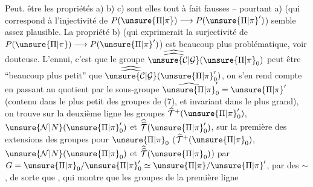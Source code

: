 
Peut. être les propriétés a) b) c) sont elles
tout à fait fausses -- pourtant a) (qui correspond à l'injectivité de
$P(\unsure{\Pi|\pi})\longrightarrow P(\unsure{\Pi|\pi}')$) semble assez plausible.
La propriété b) (qui exprimerait la surjectivité de
$P(\unsure{\Pi|\pi})\longrightarrow P(\unsure{\Pi|\pi}')$) est beaucoup plus problématique,
voir douteuse. L'ennui, c'est que le groupe
$\widehat{\widehat{\unsure{\mathcal C|\mathcal G}}}(\unsure{\Pi|\pi}_0)$
peut être ``beaucoup plus petit'' que
$\widehat{\widehat{\unsure{\mathcal C|\mathcal G}}}(\unsure{\Pi|\pi}'_0)$,
on s'en rend compte en passant au quotient par le sous-groupe
$\widehat{\unsure{\Pi|\pi}}'_0=\unsure{\Pi|\pi}'$ (contenu dans le plus petit des groupes de (7),
et invariant dans le plus grand), on trouve sur la deuxième ligne
les groupes $\widehat{\mathcal T}^{+}(\unsure{\Pi|\pi}'_0)$,
 $\unsure{\mathcal N|N}(\unsure{\Pi|\pi}'_0)$ et
$\widehat{\widehat{\mathcal T}}(\unsure{\Pi|\pi}'_0)$, sur la première
des extensions des groupes 
pour $\unsure{\Pi|\pi}_0$ ($\widehat{\mathcal T}^{+}(\unsure{\Pi|\pi}_0)$,
$\unsure{\mathcal N|N}(\unsure{\Pi|\pi}_0)$ et
$\widehat{\widehat{\mathcal T}}(\unsure{\Pi|\pi}_0)$) par
 $G=\unsure{\Pi|\pi}_0/\unsure{\Pi|\pi}'_0\simeq\unsure{\Pi|\pi}/\unsure{\Pi|\pi}'$,
 par des $\sim$, de sorte que 
,
qui montre que les groupes de la première ligne
